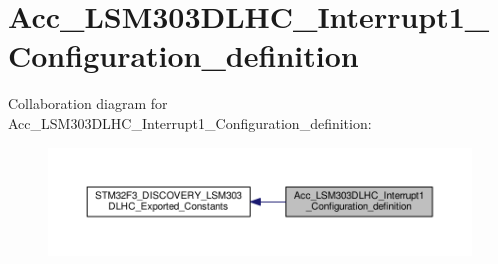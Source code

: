 \hypertarget{group__Acc__LSM303DLHC__Interrupt1__Configuration__definition}{\section{Acc\+\_\+\+L\+S\+M303\+D\+L\+H\+C\+\_\+\+Interrupt1\+\_\+\+Configuration\+\_\+definition}
\label{group__Acc__LSM303DLHC__Interrupt1__Configuration__definition}
}
Collaboration diagram for Acc\+\_\+\+L\+S\+M303\+D\+L\+H\+C\+\_\+\+Interrupt1\+\_\+\+Configuration\+\_\+definition\+:\nopagebreak
\begin{figure}[H]
\begin{center}
\leavevmode
\includegraphics[width=350pt]{group__Acc__LSM303DLHC__Interrupt1__Configuration__definition}
\end{center}
\end{figure}
